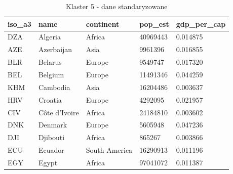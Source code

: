 \documentclass[11pt]{report}
\begin{document}
    \begin{table}[h!]
        \caption {Klaster 5 - dane standaryzowane} \label{tab:cl5std}
        \begin{tabular}{lllll}
            \hline
            \multicolumn{1}{|l|}{iso\_a3} & \multicolumn{1}{l|}{name} & \multicolumn{1}{l|}{continent} & \multicolumn{1}{l|}{pop\_est} & \multicolumn{1}{l|}{gdp\_per\_cap} \\ \hline
            DZA                           & Algeria                   & Africa                         & 40969443                      & 0.014875                           \\
            AZE                           & Azerbaijan                & Asia                           & 9961396                       & 0.016855                           \\
            BLR                           & Belarus                   & Europe                         & 9549747                       & 0.017320                           \\
            BEL                           & Belgium                   & Europe                         & 11491346                      & 0.044259                           \\
            KHM                           & Cambodia                  & Asia                           & 16204486                      & 0.003637                           \\
            HRV                           & Croatia                   & Europe                         & 4292095                       & 0.021957                           \\
            CIV                           & Côte d'Ivoire             & Africa                         & 24184810                      & 0.003602                           \\
            DNK                           & Denmark                   & Europe                         & 5605948                       & 0.047236                           \\
            DJI                           & Djibouti                  & Africa                         & 865267                        & 0.003866                           \\
            ECU                           & Ecuador                   & South America                  & 16290913                      & 0.011196                           \\
            EGY                           & Egypt                     & Africa                         & 97041072                      & 0.011387                           \\

\end{tabular}
\end{table}
\end{document}
